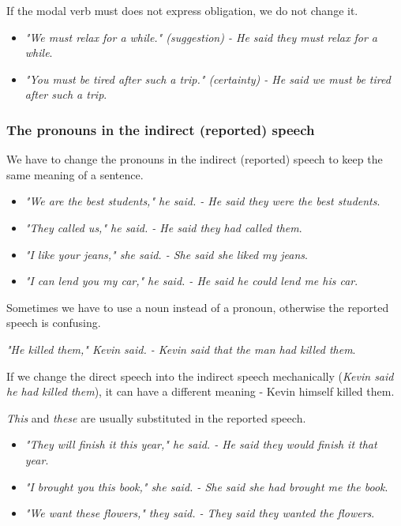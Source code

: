 \begin{itemize}
If the modal verb must does not express obligation, we do not change it.

\begin{itemize} 

\item \textit{"We must relax for a while." (suggestion) - He said they must relax for a while}. 
\item \textit{"You must be tired after such a trip." (certainty) - He said we must be tired after such a trip}.
\end{itemize}
 
\end{itemize}

\subsubsection{The pronouns in the indirect (reported) speech}

We have to change the pronouns in the indirect (reported) speech to keep the same meaning of a sentence.

\begin{itemize}

\item \textit{"We are the best students," he said. - He said they were the best students}.
\item \textit{"They called us," he said. - He said they had called them}.
\item \textit{"I like your jeans," she said. - She said she liked my jeans}.
\item \textit{"I can lend you my car," he said. - He said he could lend me his car}.
\end{itemize}

Sometimes we have to use a noun instead of a pronoun, otherwise the reported speech is confusing. 

\textit{"He killed them," Kevin said. - Kevin said that the man had killed them}. 

If we change the direct speech into the indirect speech mechanically (\textit{Kevin said he had killed them}), it can have a different meaning - Kevin himself killed them.

\textit{This} and \textit{these} are usually substituted in the reported speech. 

\begin{itemize}

\item \textit{"They will finish it this year," he said. - He said they would finish it that year}.
\item \textit{"I brought you this book," she said. - She said she had brought me the book}.
\item \textit{"We want these flowers," they said. - They said they wanted the flowers}.
\end{itemize}

